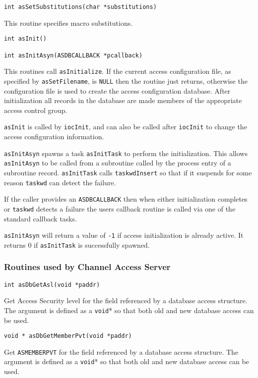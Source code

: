 \begin{verbatim}int asSetSubstitutions(char *substitutions)
\end{verbatim}This routine specifies macro substitutions.



\begin{verbatim}int asInit()

int asInitAsyn(ASDBCALLBACK *pcallback)
\end{verbatim}
This routines call \verb|asInitialize|. If the current access configuration file, as specified by \verb|asSetFilename|, is \verb|NULL| 
then the routine just returns, otherwise the configuration file is used to create the access configuration database. After 
initialization all records in the database are made members of the appropriate access control group.

\verb|asInit| is called by \verb|iocInit|, and can also be called after \verb|iocInit| to change the access configuration information.

\verb|asInitAsyn| spawns a task \verb|asInitTask| to perform the initialization. This allows \verb|asInitAsyn| to be called from a 
subroutine called by the process entry of a subroutine record. \verb|asInitTask| calls \verb|taskwdInsert| so that if it suspends 
for some reason \verb|taskwd| can detect the failure.

If the caller provides an \verb|ASDBCALLBACK| then when either initialization completes or \verb|taskwd| detects a failure the users 
callback routine is called via one of the standard callback tasks.

\verb|asInitAsyn| will return a value of \verb|-1| if access initialization is already active. It returns 0 if \verb|asInitTask| is 
successfully spawned.

\subsubsection{Routines used by Channel Access Server}

\begin{verbatim}int asDbGetAsl(void *paddr)
\end{verbatim}Get Access Security level for the field referenced by a database access structure. The argument is defined as a \verb|void|* so 
that both old and new database access can be used.



\begin{verbatim}void * asDbGetMemberPvt(void *paddr)
\end{verbatim}Get \verb|ASMEMBERPVT| for the field referenced by a database access structure. The argument is defined as a \verb|void|* so that 
both old and new database access can be used.

